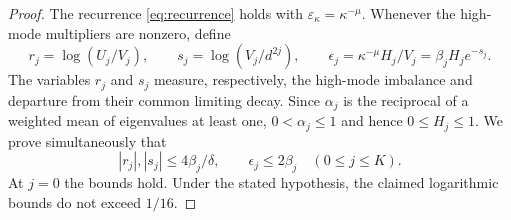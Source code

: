 \documentclass[11pt,a4paper]{article}
\theoremstyle{remark}
\begin{document}
\begin{proof}
The recurrence \eqref{eq:recurrence} holds with $\varepsilon_\kappa=\kappa^{-\mu}$. Whenever the high-mode multipliers are nonzero, define
\[
 r_j=\log(U_j/V_j),\qquad s_j=\log(V_j/d^{2j}),\qquad
 \epsilon_j=\kappa^{-\mu}H_j/V_j=\beta_jH_je^{-s_j}.
\]
The variables $r_j$ and $s_j$ measure, respectively, the high-mode imbalance and departure from their common limiting decay. Since $\alpha_j$ is the reciprocal of a weighted mean of eigenvalues at least one, $0<\alpha_j\le1$ and hence $0\le H_j\le1$. We prove simultaneously that
\begin{equation}\label{eq:bootstrap}
 |r_j|,|s_j|\le4\beta_j/\delta,\qquad\epsilon_j\le2\beta_j
 \quad(0\le j\le K).
\end{equation}
At $j=0$ the bounds hold. Under the stated hypothesis, the claimed logarithmic bounds do not exceed $1/16$.


\end{proof}
\end{document}

